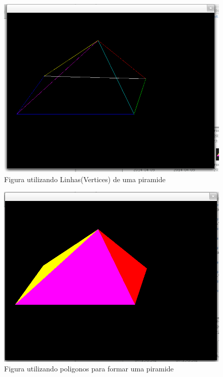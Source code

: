 \documentclass[12pt]{article}
\begin{document}
\begin{figure}[!htb]
\centering
\includegraphics[scale=0.5]{images/piramide_linha.png}
\caption{Figura utilizando Linhas(Vertices) de uma piramide}
\end{figure}

\begin{figure}[!htb]
\centering
\includegraphics[scale=0.5]{images/piramide_poligono.png}
\caption{Figura utilizando poligonos para formar uma piramide}
\end{figure}
\end{document}
